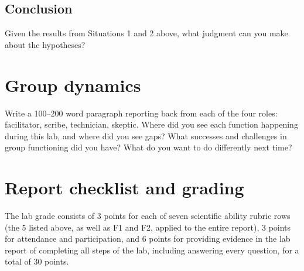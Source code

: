 
\subsection{Conclusion}

\begin{steps}
	\item Given the results from Situations 1 and 2 above, what judgment can you make about the hypotheses?
\end{steps}

\section{Group dynamics}

\begin{steps}
	\item Write a 100--200 word paragraph reporting back from each of the four roles: facilitator, scribe, technician, skeptic. Where did you see each function happening during this lab, and where did you see gaps? What successes and challenges in group functioning did you have? What do you want to do differently next time?
\end{steps}

\section{Report checklist and grading}

The lab grade consists of 3 points for each of seven scientific ability rubric rows (the 5 listed above, as well as F1 and F2, applied to the entire report), 3 points for attendance and participation, and 6 points for providing evidence in the lab report of completing all steps of the lab, including answering every question, for a total of 30 points.
